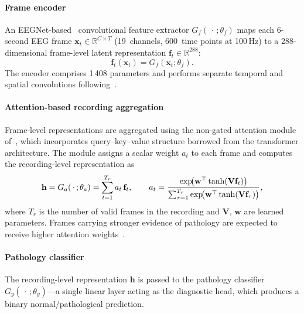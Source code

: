 \documentclass[preprint,12pt]{elsarticle}
\begin{document}
\paragraph{Frame encoder}
An EEGNet-based~\cite{lawhern2018eegnet} convolutional feature
extractor $G_f(\,\cdot\,;\theta_f)$ maps each 6-second EEG frame
$\mathbf{x}_t \in \mathbb{R}^{C \times T}$ (19~channels, 600~time
points at 100\,Hz) to a 288-dimensional frame-level latent
representation $\mathbf{f}_t \in \mathbb{R}^{288}$:
\begin{equation}
\mathbf{f}_t(\mathbf{x}_t )  = G_f(\mathbf{x}_t;\theta_f).
\label{eq:f_t}
\end{equation}
The encoder comprises 1\,408 parameters and performs separate
temporal and spatial convolutions following~\cite{lawhern2018eegnet}.

\paragraph{Attention-based recording aggregation}
Frame-level representations are aggregated using the non-gated
attention module of~\cite{poziomska2026quantity}, which incorporates
query--key--value structure borrowed from the transformer
architecture.
The module assigns a scalar weight $a_t$ to each frame and computes
the recording-level representation as
\begin{equation}
    \mathbf{h} =  G_a(\,\cdot\,; \theta_a)=\sum_{t=1}^{T_r} a_t\,\mathbf{f}_t, \qquad
    a_t = \frac{%
        \exp\!\bigl(\mathbf{w}^{\top}
        \tanh(\mathbf{V}\mathbf{f}_t)\bigr)}{%
        \sum_{\tau=1}^{T_r}
        \exp\!\bigl(\mathbf{w}^{\top}
        \tanh(\mathbf{V}\mathbf{f}_\tau)\bigr)},
\end{equation}
where $T_r$ is the number of valid frames in the recording and
$\mathbf{V}$, $\mathbf{w}$ are learned parameters.
Frames carrying stronger evidence of pathology are expected to
receive higher attention weights~\cite{poziomska2026quantity}.

\paragraph{Pathology classifier}
The recording-level representation $\mathbf{h}$ is passed to the pathology classifier $G_y(\,\cdot\,;\theta_y)$---a single linear layer acting as the diagnostic head, which produces a binary normal/pathological prediction.
\end{document}
